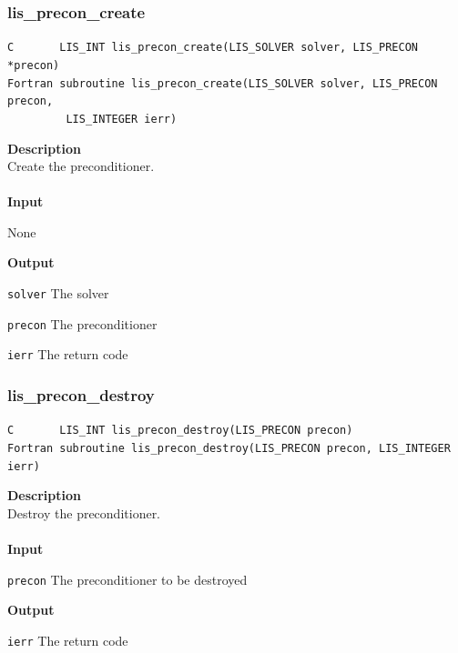 \documentclass[a4paper]{article}
\newcommand{\namelistlabel}[1]{\mbox{#1}\hfill}
\newenvironment{namelist}[1]{%
\begin{list}{}
  {\let\makelabel\namelistlabel
  \settowidth{\labelwidth}{#1}
  \setlength{\leftmargin}{1.1\labelwidth}}
  }{%
\end{list}}
\begin{document}
\newpage
\subsubsection{lis\_precon\_create}
\begin{screen}
\verb|C       LIS_INT lis_precon_create(LIS_SOLVER solver, LIS_PRECON *precon)|\\
\verb|Fortran subroutine lis_precon_create(LIS_SOLVER solver, LIS_PRECON precon,|\\
\verb|         LIS_INTEGER ierr)|
\end{screen}
{\bf Description}\\
\indent
Create the preconditioner.
\\ \\
\noindent
{\bf Input}
\begin{namelist}{XXXXXXXXXXXXXXXXXXXX}
\item[None]
\end{namelist}
{\bf Output}
\begin{namelist}{XXXXXXXXXXXXXXXXXXXX}
\item[\tt solver] The solver
\item[\tt precon] The preconditioner
\item[\tt ierr] The return code
\end{namelist}

\subsubsection{lis\_precon\_destroy}
\begin{screen}
\verb|C       LIS_INT lis_precon_destroy(LIS_PRECON precon)|\\
\verb|Fortran subroutine lis_precon_destroy(LIS_PRECON precon, LIS_INTEGER ierr)|
\end{screen}
{\bf Description}\\
\indent
Destroy the preconditioner.
\\ \\
\noindent
{\bf Input}
\begin{namelist}{XXXXXXXXXXXXXXXXXXXX}
\item[\tt precon] The preconditioner to be destroyed
\end{namelist}
{\bf Output}
\begin{namelist}{XXXXXXXXXXXXXXXXXXXX}
\item[\tt ierr] The return code
\end{namelist}

\newpage
\end{document}
